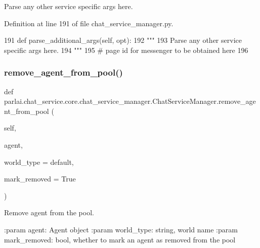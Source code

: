\begin{DoxyVerb}Parse any other service specific args here.
\end{DoxyVerb}
 

Definition at line 191 of file chat\+\_\+service\+\_\+manager.\+py.


\begin{DoxyCode}
191     \textcolor{keyword}{def }parse\_additional\_args(self, opt):
192         \textcolor{stringliteral}{"""}
193 \textcolor{stringliteral}{        Parse any other service specific args here.}
194 \textcolor{stringliteral}{        """}
195         \textcolor{comment}{# page id for messenger to be obtained here}
196 
\end{DoxyCode}
\mbox{\label{classparlai_1_1chat__service_1_1core_1_1chat__service__manager_1_1ChatServiceManager_a926a7c35369cb78cc81839cf2c7c1321}} 
\subsubsection{\texorpdfstring{remove\+\_\+agent\+\_\+from\+\_\+pool()}{remove\_agent\_from\_pool()}}
{\footnotesize\ttfamily def parlai.\+chat\+\_\+service.\+core.\+chat\+\_\+service\+\_\+manager.\+Chat\+Service\+Manager.\+remove\+\_\+agent\+\_\+from\+\_\+pool (\begin{DoxyParamCaption}\item[{}]{self,  }\item[{}]{agent,  }\item[{}]{world\+\_\+type = {\ttfamily \textquotesingle{}default\textquotesingle{}},  }\item[{}]{mark\+\_\+removed = {\ttfamily True} }\end{DoxyParamCaption})}

\begin{DoxyVerb}Remove agent from the pool.

:param agent:
    Agent object
:param world_type:
    string, world name
:param mark_removed:
    bool, whether to mark an agent as removed from the pool
\end{DoxyVerb}
 

